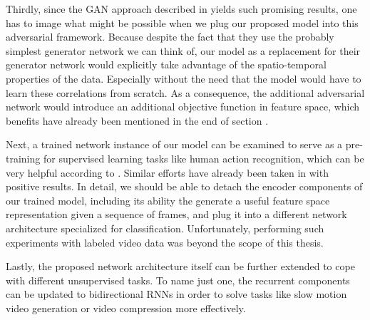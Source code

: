 Thirdly, since the GAN approach described in \label{sec:related_gan} yields such promising results, one has to image what might be possible when we plug our proposed model into this adversarial framework. Because despite the fact that they use the probably simplest generator network we can think of, our model as a replacement for their generator network would explicitly take advantage of the spatio-temporal properties of the data. Especially without the need that the model would have to learn these correlations from scratch. As a consequence, the additional adversarial network would introduce an additional objective function in feature space, which benefits have already been mentioned in the end of section \label{sec:impl-components}.

Next, a trained network instance of our model can be examined to serve as a pre-training for supervised learning tasks like human action recognition, which can be very helpful according to \parencite[p. 20]{deep_arch_ai}. Similar efforts have already been taken in \parencite{unsup_learn_lstm} with positive results. In detail, we should be able to detach the encoder components of our trained model, including its ability the generate a useful feature space representation given a sequence of frames, and plug it into a different network architecture specialized for classification. Unfortunately, performing such experiments with labeled video data was beyond the scope of this thesis.

Lastly, the proposed network architecture itself can be further extended to cope with different unsupervised tasks. To name just one, the recurrent components can be updated to bidirectional RNNs in order to solve tasks like slow motion video generation or video compression more effectively.